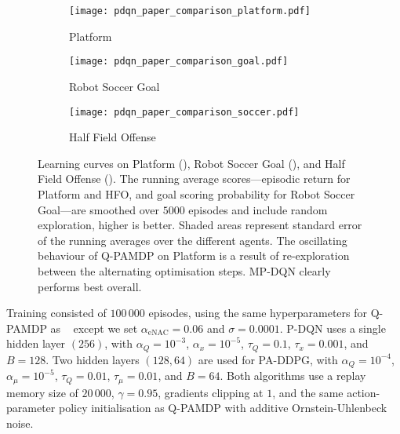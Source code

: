 \documentclass{article}
\def\PDQN*{P\nobreakdash-DQN}
\def\MPDQN*{MP\nobreakdash-DQN}
\def\QPAMDP*{Q\nobreakdash-PAMDP}
\def\PADDPG*{PA\nobreakdash-DDPG}
\newcommand{\citet}[1]
{\citeauthor{#1}~\shortcite{#1}}
\begin{document}
\begin{figure}[ht!]
	\begin{subfigure}[t]{\linewidth}
		\centering
		\texttt{[image: pdqn\_paper\_comparison\_platform.pdf]}
		\caption{Platform}
		\label{fig:learning_curves_platform}
	\end{subfigure}
	\vspace*{0.15cm}
	\begin{subfigure}[t]{\linewidth}
		\centering
		\texttt{[image: pdqn\_paper\_comparison\_goal.pdf]}
		\caption{Robot Soccer Goal}
		\label{fig:learning_curves_robot_soccer_goal}
	\end{subfigure}
	\vspace*{0.15cm}
	\begin{subfigure}[t]{\linewidth}
		\centering
		\texttt{[image: pdqn\_paper\_comparison\_soccer.pdf]}
		\caption{Half Field Offense}
		\label{fig:learning_curves_hfo}
	\end{subfigure}
\caption{Learning curves on Platform (), Robot Soccer Goal (), and Half Field Offense (). The running average scores---episodic return for Platform and HFO, and goal scoring probability for Robot Soccer Goal---are smoothed over $5000$ episodes and include random exploration, higher is better. Shaded areas represent standard error of the running averages over the different agents. The oscillating behaviour of \QPAMDP* on Platform is a result of re-exploration between the alternating optimisation steps. \MPDQN* clearly performs best overall. }
	\label{fig:learning_curves}
\end{figure}

Training consisted of $100\,000$ episodes, using the same hyperparameters for \QPAMDP* as \citet{masson2016} except we set $\alpha_{\text{eNAC}} = 0.06$ and $\sigma = 0.0001$. \PDQN* uses a single hidden layer $(256)$, with $\alpha_Q = 10^{-3}$, $\alpha_x = 10^{-5}$, $\tau_Q = 0.1$, $\tau_x = 0.001$, and $B = 128$. Two hidden layers $(128,64)$ are used for \PADDPG*, with $\alpha_Q = 10^{-4}$, $\alpha_\mu = 10^{-5}$, $\tau_Q = 0.01$, $\tau_\mu = 0.01$, and $B = 64$. Both algorithms use a replay memory size of $20\,000$, $\gamma = 0.95$, gradients clipping at $1$, and the same action-parameter policy initialisation as \QPAMDP* with additive Ornstein-Uhlenbeck noise.
\end{document}
